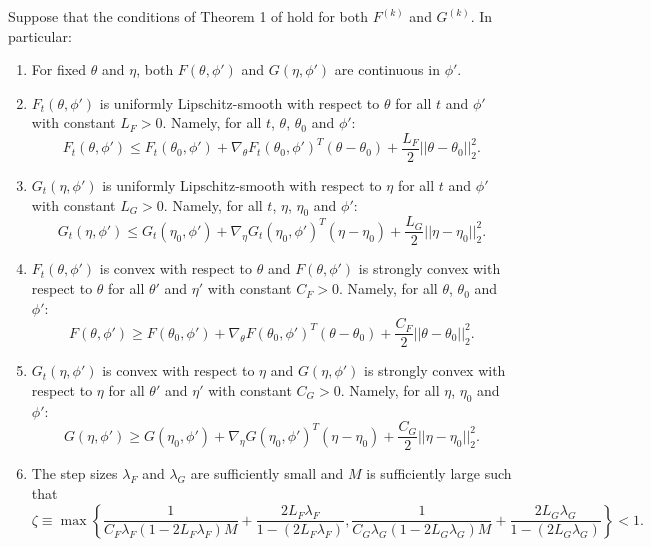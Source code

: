     
\begin{theorem}

    Suppose that the conditions of Theorem 1 of \citet{Johnson:2013} hold for both $F^{(k)}$ and $G^{(k)}$. In particular:
    
    \begin{enumerate}
        \item For fixed $\theta$ and $\eta$, both $F(\theta,\phi')$ and $G(\eta,\phi')$ are continuous in $\phi'$.
        \item $F_t(\theta,\phi')$ is uniformly Lipschitz-smooth with respect to $\theta$ for all $t$ and $\phi'$ with constant $L_F > 0$. Namely, for all $t$, $\theta$, $\theta_0$ and $\phi'$:
        $$F_t(\theta, \phi') \leq F_t(\theta_0,\phi') + \nabla_\theta F_t(\theta_0, \phi')^T(\theta-\theta_0) + \frac{L_F}{2} ||\theta - \theta_0||_2^2.$$ 
        \item $G_t(\eta,\phi')$ is uniformly Lipschitz-smooth with respect to $\eta$ for all $t$ and $\phi'$ with constant $L_G > 0$. Namely, for all $t$, $\eta$, $\eta_0$ and $\phi'$:
        $$G_t(\eta, \phi') \leq G_t(\eta_0,\phi') + \nabla_\eta G_t(\eta_0,\phi')^T(\eta-\eta_0) + \frac{L_G}{2} ||\eta - \eta_0||_2^2.$$
        \item $F_t(\theta,\phi')$ is convex with respect to $\theta$ and $F(\theta,\phi')$ is strongly convex with respect to $\theta$ for all $\theta'$ and $\eta'$ with constant $C_F > 0$. Namely, for all $\theta$, $\theta_0$ and $\phi'$:
        $$F(\theta, \phi') \geq F(\theta_0,\phi') + \nabla_\theta F(\theta_0, \phi')^T(\theta-\theta_0) + \frac{C_F}{2} ||\theta - \theta_0||_2^2.$$ 
        \item $G_t(\eta,\phi')$ is convex with respect to $\eta$ and $G(\eta,\phi')$ is strongly convex with respect to $\eta$ for all $\theta'$ and $\eta'$ with constant $C_G > 0$. Namely, for all $\eta$, $\eta_0$ and $\phi'$:
        $$G(\eta, \phi') \geq G(\eta_0,\phi') + \nabla_\eta G(\eta_0, \phi')^T (\eta-\eta_0) + \frac{C_G}{2} ||\eta - \eta_0||_2^2.$$ 
        \item The step sizes $\lambda_F$ and $\lambda_G$ are sufficiently small and $M$ is sufficiently large such that 
        $$\zeta \equiv \max \left\{\frac{1}{C_F \lambda_F(1-2L_F\lambda_F)M} + \frac{2L_F\lambda_F}{1-(2L_F\lambda_F)}, \frac{1}{C_G \lambda_G(1-2L_G\lambda_G)M} + \frac{2L_G\lambda_G}{1-(2L_G\lambda_G)}\right\} < 1.$$
    \end{enumerate}


\end{theorem}
